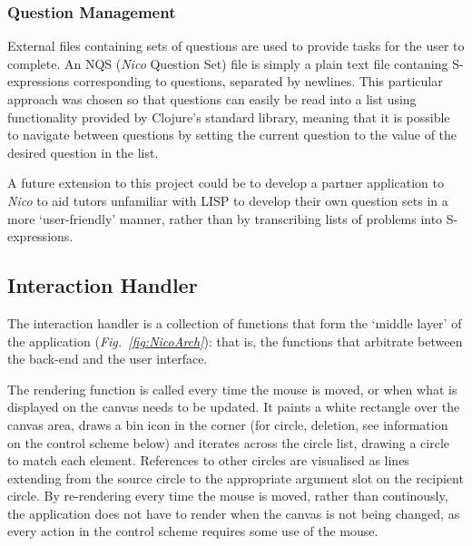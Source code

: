 \documentclass[12pt,twoside,notitlepage,xetex]{report}
\begin{document}
\subsubsection{Question Management}

External files containing sets of questions are used to provide tasks for the user to complete.  An NQS (\emph{Nico} Question Set) file is simply a plain text file contaning S-expressions corresponding to questions, separated by newlines.  This particular approach was chosen so that questions can easily be read into a list using functionality provided by Clojure's standard library, meaning that it is possible to navigate between questions by setting the current question to the value of the desired question in the list.

A future extension to this project could be to develop a partner application to \emph{Nico} to aid tutors unfamiliar with LISP to develop their own question sets in a more `user-friendly' manner, rather than by transcribing lists of problems into S-expressions.

\subsection{Interaction Handler}
%

The interaction handler is a collection of functions that form the `middle layer' of the application (\emph{Fig.~\ref{fig:NicoArch}}): that is, the functions that arbitrate between the back-end and the user interface.

The rendering function is called every time the mouse is moved, or when what is displayed on the canvas needs to be updated.  It paints a white rectangle over the canvas area, draws a bin icon in the corner (for circle, deletion, see information on the control scheme below) and iterates across the circle list, drawing a circle to match each element.  References to other circles are visualised as lines extending from the source circle to the appropriate argument slot on the recipient circle.  By re-rendering every time the mouse is moved, rather than continously, the application does not have to render when the canvas is not being changed, as every action in the control scheme requires some use of the mouse.
\end{document}
